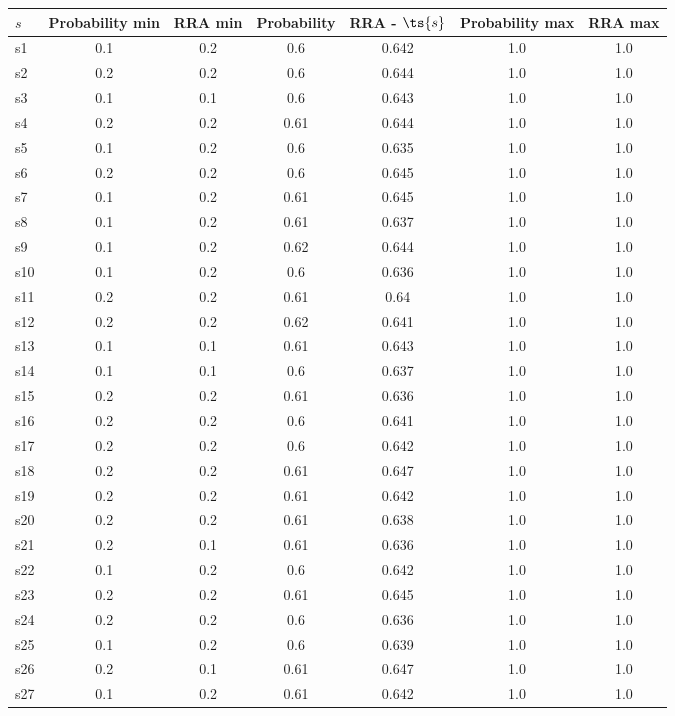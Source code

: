\documentclass{article}
\begin{document}
\noindent\begin{tabular}{|l|c|c|c|c|c|c|}
\hline
$s$& Probability min & RRA min & Probability & RRA - $\ts{s}$ & Probability max & RRA max\\
\hline
s1 &0.1 & 0.2 & 0.6 & 0.642 & 1.0 & 1.0\\
\hline
s2 &0.2 & 0.2 & 0.6 & 0.644 & 1.0 & 1.0\\
\hline
s3 &0.1 & 0.1 & 0.6 & 0.643 & 1.0 & 1.0\\
\hline
s4 &0.2 & 0.2 & 0.61 & 0.644 & 1.0 & 1.0\\
\hline
s5 &0.1 & 0.2 & 0.6 & 0.635 & 1.0 & 1.0\\
\hline
s6 &0.2 & 0.2 & 0.6 & 0.645 & 1.0 & 1.0\\
\hline
s7 &0.1 & 0.2 & 0.61 & 0.645 & 1.0 & 1.0\\
\hline
s8 &0.1 & 0.2 & 0.61 & 0.637 & 1.0 & 1.0\\
\hline
s9 &0.1 & 0.2 & 0.62 & 0.644 & 1.0 & 1.0\\
\hline
s10 &0.1 & 0.2 & 0.6 & 0.636 & 1.0 & 1.0\\
\hline
s11 &0.2 & 0.2 & 0.61 & 0.64 & 1.0 & 1.0\\
\hline
s12 &0.2 & 0.2 & 0.62 & 0.641 & 1.0 & 1.0\\
\hline
s13 &0.1 & 0.1 & 0.61 & 0.643 & 1.0 & 1.0\\
\hline
s14 &0.1 & 0.1 & 0.6 & 0.637 & 1.0 & 1.0\\
\hline
s15 &0.2 & 0.2 & 0.61 & 0.636 & 1.0 & 1.0\\
\hline
s16 &0.2 & 0.2 & 0.6 & 0.641 & 1.0 & 1.0\\
\hline
s17 &0.2 & 0.2 & 0.6 & 0.642 & 1.0 & 1.0\\
\hline
s18 &0.2 & 0.2 & 0.61 & 0.647 & 1.0 & 1.0\\
\hline
s19 &0.2 & 0.2 & 0.61 & 0.642 & 1.0 & 1.0\\
\hline
s20 &0.2 & 0.2 & 0.61 & 0.638 & 1.0 & 1.0\\
\hline
s21 &0.2 & 0.1 & 0.61 & 0.636 & 1.0 & 1.0\\
\hline
s22 &0.1 & 0.2 & 0.6 & 0.642 & 1.0 & 1.0\\
\hline
s23 &0.2 & 0.2 & 0.61 & 0.645 & 1.0 & 1.0\\
\hline
s24 &0.2 & 0.2 & 0.6 & 0.636 & 1.0 & 1.0\\
\hline
s25 &0.1 & 0.2 & 0.6 & 0.639 & 1.0 & 1.0\\
\hline
s26 &0.2 & 0.1 & 0.61 & 0.647 & 1.0 & 1.0\\
\hline
s27 &0.1 & 0.2 & 0.61 & 0.642 & 1.0 & 1.0\\

\end{tabular}
\end{document}
